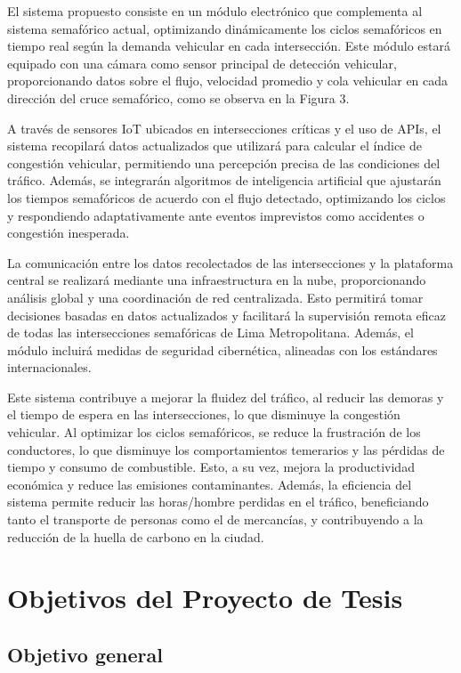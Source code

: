 \documentclass[12pt,a4paper,oneside]{report}
\begin{document}
El sistema propuesto consiste en un módulo electrónico que complementa al sistema semafórico actual, optimizando dinámicamente los ciclos semafóricos en tiempo real según la demanda vehicular en cada intersección. Este módulo estará equipado con una cámara como sensor principal de detección vehicular, proporcionando datos sobre el flujo, velocidad promedio y cola vehicular en cada dirección del cruce semafórico, como se observa en la Figura 3.

A través de sensores IoT ubicados en intersecciones críticas y el uso de APIs, el sistema recopilará datos actualizados que utilizará para calcular el índice de congestión vehicular, permitiendo una percepción precisa de las condiciones del tráfico. Además, se integrarán algoritmos de inteligencia artificial que ajustarán los tiempos semafóricos de acuerdo con el flujo detectado, optimizando los ciclos y respondiendo adaptativamente ante eventos imprevistos como accidentes o congestión inesperada.

La comunicación entre los datos recolectados de las intersecciones y la plataforma central se realizará mediante una infraestructura en la nube, proporcionando análisis global y una coordinación de red centralizada. Esto permitirá tomar decisiones basadas en datos actualizados y facilitará la supervisión remota eficaz de todas las intersecciones semafóricas de Lima Metropolitana. Además, el módulo incluirá medidas de seguridad cibernética, alineadas con los estándares internacionales.

Este sistema contribuye a mejorar la fluidez del tráfico, al reducir las demoras y el tiempo de espera en las intersecciones, lo que disminuye la congestión vehicular. Al optimizar los ciclos semafóricos, se reduce la frustración de los conductores, lo que disminuye los comportamientos temerarios y las pérdidas de tiempo y consumo de combustible. Esto, a su vez, mejora la productividad económica y reduce las emisiones contaminantes. Además, la eficiencia del sistema permite reducir las horas/hombre perdidas en el tráfico, beneficiando tanto el transporte de personas como el de mercancías, y contribuyendo a la reducción de la huella de carbono en la ciudad.

\section{Objetivos del Proyecto de Tesis}\label{objetivos-del-proyecto-de-tesis}

\subsection{Objetivo general}\label{objetivo-general}
\end{document}
